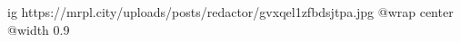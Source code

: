  
 
 
 
 

\ifcmt
  ig https://mrpl.city/uploads/posts/redactor/gvxqel1zfbdsjtpa.jpg
  @wrap center
  @width 0.9
\fi
